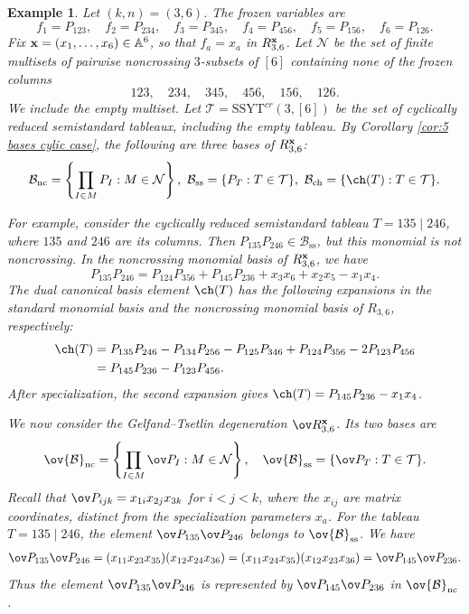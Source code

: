 \documentclass[11pt]{amsart}
\numberwithin{equation}{section}
\newtheorem{example}[thm]{Example}
\newcommand{\bA}{{\mathbb A}}
\newcommand{\bfx}{{\bf x}}
\newcommand{\SSYT}{\mathrm{SSYT}}
\begin{document}
\begin{example}
Let $(k,n)=(3,6)$. The frozen variables are
\[
f_1=P_{123},\quad f_2=P_{234},\quad
f_3=P_{345},\quad f_4=P_{456},\quad
f_5=P_{156},\quad f_6=P_{126}.
\]
Fix $\bfx=(x_1,\ldots,x_6)\in\bA^6$, so that
$f_a=x_a$ in $R_{3,6}^{\bfx}$. Let $\mathcal N$ be the set of finite multisets
of pairwise noncrossing $3$-subsets of $[6]$
containing none of the frozen columns
\[
123,\quad234,\quad345,\quad456,\quad
156,\quad126.
\]
We include the empty multiset.
Let $\mathcal T=\SSYT^{cr}(3,[6])$
be the set of cyclically reduced semistandard
tableaux, including the empty tableau.
By Corollary \ref{cor:5 bases cylic case}, the following
are three bases of $R_{3,6}^{\bfx}$:
\[
\begin{aligned}
\mathcal B_{\mathrm{nc}}
=\left\{\prod_{I\in M}P_I:
M\in\mathcal N\right\}, \ 
\mathcal B_{\mathrm{ss}}
=\{P_T:T\in\mathcal T\}, \ 
\mathcal B_{\mathrm{ch}}
=\{\ch(T):T\in\mathcal T\}.
\end{aligned}
\]

For example, consider the cyclically reduced
semistandard tableau $T=135\mid246$,
where $135$ and $246$ are its columns.
Then $P_{135}P_{246}\in\mathcal B_{\mathrm{ss}}$,
but this monomial is not noncrossing.
In the noncrossing monomial basis of $R_{3,6}^{\bfx}$,
we have
\[
P_{135}P_{246}
=P_{124}P_{356}+P_{145}P_{236}
+ x_3x_6+x_2x_5-x_1x_4.
\]
The dual canonical basis element $\ch(T)$
has the following expansions in the standard monomial
basis and the noncrossing monomial basis of $R_{3,6}$,
respectively:
\[
\begin{aligned}
\ch(T)
&=P_{135}P_{246}-P_{134}P_{256}
-P_{125}P_{346}+P_{124}P_{356}
-2P_{123}P_{456}\\
&=P_{145}P_{236}-P_{123}P_{456}.
\end{aligned}
\]
After specialization, the second expansion gives $\ch(T)=P_{145}P_{236}-x_1x_4$.
 

We now consider the Gelfand--Tsetlin
degeneration $\ov R_{3,6}^{\bfx}$.
Its two bases are
\[
\begin{aligned}
\ov{\mathcal B}_{\mathrm{nc}}
=\left\{\prod_{I\in M}\ov P_I:
M\in\mathcal N\right\},\quad 
\ov{\mathcal B}_{\mathrm{ss}}
=\{\ov P_T:T\in\mathcal T\}.
\end{aligned}
\]
Recall that $\ov P_{ijk}=x_{1i}x_{2j}x_{3k}$
for $i<j<k$, where the $x_{ij}$ are
matrix coordinates, distinct from the
specialization parameters $x_a$.
For the tableau $T=135\mid246$, the element $\ov P_{135}\ov P_{246}$ belongs to
$\ov{\mathcal B}_{\mathrm{ss}}$. We have
\[
\begin{aligned}
\ov P_{135}\ov P_{246}
=(x_{11}x_{23}x_{35})
  (x_{12}x_{24}x_{36})=(x_{11}x_{24}x_{35})
  (x_{12}x_{23}x_{36})=\ov P_{145}\ov P_{236}.
\end{aligned}
\]
Thus the element $\ov P_{135}\ov P_{246}$ is represented by
$\ov P_{145}\ov P_{236}$ in
$\ov{\mathcal B}_{\mathrm{nc}}$.
\end{example}
\end{document}
